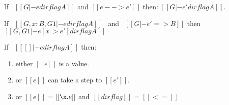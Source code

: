 \begin{lemma}
\label{lemma:union:preservation}
  If \ $[[G |- e dirflag A]]$ and $[[e --> e']]$ then: $[[G |- e' dirflag A]]$.
\end{lemma}

\begin{comment}
\begin{proof}
  By induction on typing relation and subsequent inverting reduction relation.
  \begin{itemize}
    \item Cases \rref{typ-int, typ-var, typ-sub, typ-abs} are trivial to prove.
    \item Case \rref{typ-ann} requires helping \cref{lemma:union:check-pexpr-ann}.
    \item Case \rref{typ-app} requires helping \cref{lemma:union:pexpr-check-sub}
          and substitution \cref{lemma:union:substitution} for beta reduction.
    \item Case \rref{typ-typeof} requires substitution \cref{lemma:union:substitution}.
  \end{itemize}
\end{proof}

\baber{ToDo: change name of helping lemmas.}

\begin{lemma}[check-pexpr-ann]
\label{lemma:union:check-pexpr-ann}
  If \ $[[G |- p:C <= A]]$ \ then \ $[[G |- p <= A]]$.
\end{lemma}

\begin{lemma}[pexpr-check-sub]
\label{lemma:union:pexpr-check-sub}
  If \ $[[G |- p <= A]]$ \ and \ $[[A <: B]]$ \ then \ $[[G |- p <= B]]$.
\end{lemma}
\end{comment}

\begin{lemma}[Substitution]
\label{lemma:union:substitution}
  If \ $[[G, x:B , G1 |- e dirflag A]]$ \ and \ $[[G |- e' => B]]$
  then \ $[[G, G1 |- e [ x ~> e' ] dirflag A]]$
\end{lemma}

\begin{lemma}[Progress]
\label{lemma:union:progress}
If \ $[[ [] |- e dirflag A]]$ then:
 \begin{enumerate}
  \item either $[[e]]$ is a value.
  \item or $[[e]]$ can take a step to $[[e']]$.
  \item or $[[e]]$ = $[[\x.e]]$ and $[[dirflag]]$ = $[[<=]]$
  \end{enumerate}
\end{lemma}

